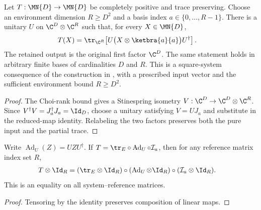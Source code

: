 \begin{theorem}
    \label{thm:bounded_retained_system_dilation}
    \leanok
    Let $T:\MN{D}\to\MN{D}$ be completely positive and trace preserving.
    Choose an environment dimension $R\geq D^2$ and a basis index
    $a\in\{0,\ldots,R-1\}$. There is a unitary $U$ on
    $\C^D\otimes\C^R$ such that, for every $X\in\MN{D}$,
    \begin{align}
        T(X) & =\tr_{\C^R}\!\left[
            U\bigl(X\otimes\ketbra{a}{a}\bigr)U^\dagger\right].
        \label{eq:representations_retained_system_dilation}
    \end{align}
    The retained output is the original first factor $\C^D$.
    The same statement holds in arbitrary finite bases of cardinalities
    $D$ and $R$. This is a square-system consequence of the construction in
    \cite[Theorems~2.2 and~2.5]{Wolf2012Quantum}, with a prescribed input
    vector and the sufficient environment bound $R\geq D^2$.
\end{theorem}
\begin{proof}\leanok
    The Choi-rank bound gives a Stinespring isometry
    $V:\C^D\to\C^D\otimes\C^R$.
    Since $V^\dagger V=J_a^\dagger J_a=\Id_D$, choose a unitary
    satisfying $V=UJ_a$ and substitute in the reduced-map identity.
    Relabeling the two factors preserves both the pure input and the
    partial trace.
\end{proof}

\begin{theorem}
    \label{thm:pure_environment_reference}
    \leanok
    Write $\operatorname{Ad}_U(Z)=UZU^\dagger$. If
    $T=\tr_E\circ\operatorname{Ad}_U\circ\mathcal I_a$, then for any
    reference matrix index set $R$,
    \begin{align}
        T\otimes\Id_R
         & =(\tr_E\otimes\Id_R)\circ
        (\operatorname{Ad}_U\otimes\Id_R)\circ
        (\mathcal I_a\otimes\Id_R).
        \label{eq:representations_environment_reference}
    \end{align}
    This is an equality on all system--reference matrices.
\end{theorem}
\begin{proof}\leanok
    Tensoring by the identity preserves composition of linear maps.
\end{proof}

